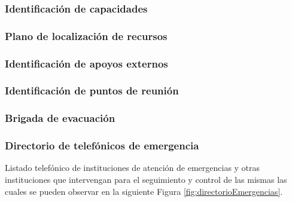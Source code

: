     
    \subsubsection{Identificación de capacidades}
    
    
    
    \subsubsection{Plano de localización de recursos}
    
    
    \subsubsection{ Identificación de apoyos externos}
    
    
    \subsubsection{Identificación de puntos de reunión}
    
    \subsubsection{Brigada de evacuación}
    
    \subsubsection{Directorio de telefónicos de emergencia}
    
    Listado telefónico de instituciones de atención de emergencias y otras instituciones que intervengan para el seguimiento y control de las mismas las cuales se pueden observar en la siguiente Figura \ref{fig:directorioEmergencias}.
    
